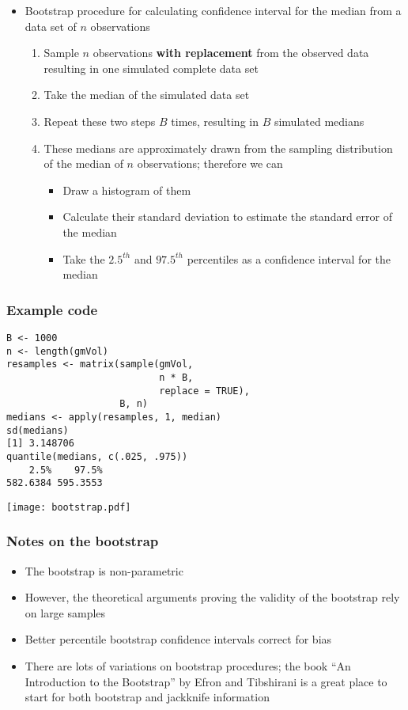 \documentclass[aspectratio=169]{beamer}
\begin{document}
\begin{frame}
\begin{itemize}
\item Bootstrap procedure for calculating confidence interval for the median from a data
  set of $n$ observations
  \begin{enumerate}[$i.$]
  \item Sample $n$ observations {\bf with replacement} from the observed
    data resulting in one simulated complete data set
  \item Take the median of the simulated data set
  \item Repeat these two steps $B$ times, resulting in $B$ simulated
    medians
  \item These medians are approximately drawn from the sampling distribution
    of the median of $n$ observations; therefore we can
    \begin{itemize}
    \item Draw a histogram of them
    \item Calculate their standard deviation to estimate the standard error
      of the median
    \item Take the $2.5^{th}$ and $97.5^{th}$ percentiles as a confidence interval
      for the median
    \end{itemize}
  \end{enumerate}
\end{itemize}
\end{frame}

\begin{frame}[fragile]\frametitle{Example code}
\begin{verbatim}
B <- 1000
n <- length(gmVol)
resamples <- matrix(sample(gmVol,
                           n * B,
                           replace = TRUE),
                    B, n)
medians <- apply(resamples, 1, median)
sd(medians)
[1] 3.148706
quantile(medians, c(.025, .975))
    2.5%    97.5% 
582.6384 595.3553 
\end{verbatim}
\end{frame}

\begin{frame}
\texttt{[image: bootstrap.pdf]}
\end{frame}

\begin{frame}\frametitle{Notes on the bootstrap}
\begin{itemize}
\item The bootstrap is non-parametric
\item However, the theoretical arguments proving the validity of the
  bootstrap rely on large samples
\item Better percentile bootstrap confidence intervals correct for bias
\item There are lots of variations on bootstrap procedures; the book
  ``An Introduction to the Bootstrap'' by Efron and Tibshirani is a
  great place to start for both bootstrap and jackknife information
\end{itemize}
\end{frame}
\end{document}
